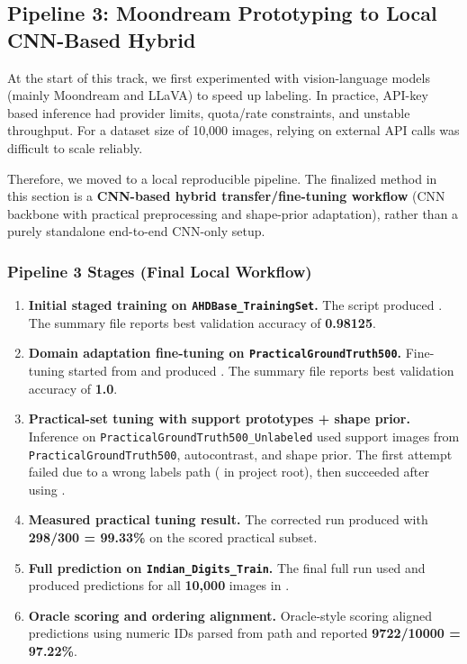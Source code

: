 \subsection{Pipeline 3: Moondream Prototyping to Local CNN-Based Hybrid}

At the start of this track, we first experimented with vision-language models (mainly Moondream and LLaVA) to speed up labeling. In practice, API-key based inference had provider limits, quota/rate constraints, and unstable throughput. For a dataset size of 10,000 images, relying on external API calls was difficult to scale reliably.

Therefore, we moved to a local reproducible pipeline. The finalized method in this section is a \textbf{CNN-based hybrid transfer/fine-tuning workflow} (CNN backbone with practical preprocessing and shape-prior adaptation), rather than a purely standalone end-to-end CNN-only setup.

\subsubsection{Pipeline 3 Stages (Final Local Workflow)}

\begin{enumerate}
    \item \textbf{Initial staged training on \texttt{AHDBase\_TrainingSet}.}
    The script  produced . The summary file reports best validation accuracy of \textbf{0.98125}.

    \item \textbf{Domain adaptation fine-tuning on \texttt{PracticalGroundTruth500}.}
    Fine-tuning started from  and produced . The summary file reports best validation accuracy of \textbf{1.0}.

    \item \textbf{Practical-set tuning with support prototypes + shape prior.}
    Inference on \texttt{PracticalGroundTruth500\_Unlabeled} used support images from \texttt{PracticalGroundTruth500}, autocontrast, and shape prior. The first attempt failed due to a wrong labels path ( in project root), then succeeded after using .

    \item \textbf{Measured practical tuning result.}
    The corrected run produced  with \textbf{298/300 = 99.33\%} on the scored practical subset.

    \item \textbf{Full prediction on \texttt{Indian\_Digits\_Train}.}
    The final full run used  and produced predictions for all \textbf{10,000} images in .

    \item \textbf{Oracle scoring and ordering alignment.}
    Oracle-style scoring aligned predictions using numeric IDs parsed from path and reported \textbf{9722/10000 = 97.22\%}.
\end{enumerate}

